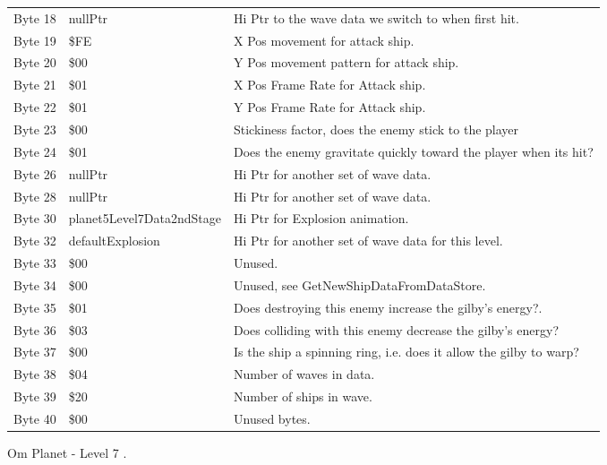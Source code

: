 \begin{figure}[H]
{\begin{adjustbox}{width=12cm}
\begin{tabular}{lll}
 Byte 18 & nullPtr                   & Hi Ptr to the wave data we switch to when first hit.               \\
 Byte 19 & \$FE                       & X Pos movement for attack ship.                                    \\
 Byte 20 & \$00                       & Y Pos movement pattern for attack ship.                            \\
 Byte 21 & \$01                       & X Pos Frame Rate for Attack ship.                                  \\
 Byte 22 & \$01                       & Y Pos Frame Rate for Attack ship.                                  \\
 Byte 23 & \$00                       & Stickiness factor, does the enemy stick to the player              \\
 Byte 24 & \$01                       & Does the enemy gravitate quickly toward the player when its hit?   \\
 Byte 26 & nullPtr                   & Hi Ptr for another set of wave data.                               \\
 Byte 28 & nullPtr                   & Hi Ptr for another set of wave data.                               \\
 Byte 30 & planet5Level7Data2ndStage & Hi Ptr for Explosion animation.                                    \\
 Byte 32 & defaultExplosion          & Hi Ptr for another set of wave data for this level.                \\
 Byte 33 & \$00                       & Unused.                                                            \\
 Byte 34 & \$00                       & Unused, see GetNewShipDataFromDataStore.                           \\
 Byte 35 & \$01                       & Does destroying this enemy increase the gilby's energy?.           \\
 Byte 36 & \$03                       & Does colliding with this enemy decrease the gilby's energy?        \\
 Byte 37 & \$00                       & Is the ship a spinning ring, i.e. does it allow the gilby to warp? \\
 Byte 38 & \$04                       & Number of waves in data.                                           \\
 Byte 39 & \$20                       & Number of ships in wave.                                           \\
 Byte 40 & \$00                       & Unused bytes.                                                      \\
\bottomrule
\end{tabular}

  \end{adjustbox}

  }\caption*{Om Planet - Level 7
.}
\end{figure}

